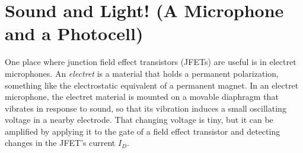 \section{Sound and Light! (A Microphone and a Photocell)}
\label{lab_microphone_photocell}


\bigskip

One place where junction field effect transistors (JFETs) are useful is in electret microphones.  An \textit{electret} is a material that holds a permanent polarization, something like the electrostatic equivalent of a permanent magnet.  In an electret microphone, the electret material is mounted on a movable diaphragm that vibrates in response to sound, so that its vibration induces a small oscillating voltage in a nearby electrode.  That changing voltage is tiny, but it can be amplified by applying it to the gate of a field effect transistor and detecting changes in the JFET's current $I_D$.


